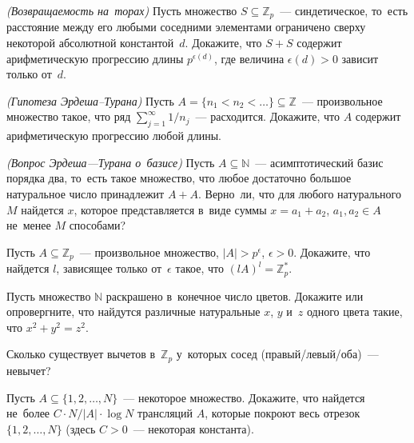 \begin{problems}
\itemx{*}\emph{(Возвращаемость на~торах)}\enspace
Пусть множество $S \subseteq \mathbb{Z}_p$~--- синдетическое, то~есть
расстояние между его любыми соседними элементами ограничено сверху некоторой
абсолютной константой~$d$.
Докажите, что $S + S$ содержит арифметическую прогрессию длины
$p^{\epsilon(d)}$, где величина $\epsilon(d) > 0$ зависит только от~$d$.

\itemx{*}\emph{(Гипотеза Эрдеша--Турана)}\enspace
Пусть $A = \{ n_1 < n_2 < \ldots \} \subseteq \mathbb{Z}$~--- произвольное
множество такое, что ряд
\(
    \sum_{j=1}^\infty
        1 / n_j
\)~--- расходится.
Докажите, что $A$ содержит арифметическую прогрессию любой длины.

\itemx{*}\emph{(Вопрос Эрдеша---Турана о~базисе)}\enspace
Пусть $A \subseteq \mathbb{N}$~--- асимптотический базис порядка два, то~есть
такое множество, что любое достаточно большое натуральное число принадлежит
$A + A$.
Верно~ли, что для любого натурального~$M$ найдется $x$, которое представляется
в~виде суммы $x = a_1 + a_2$, $a_1, a_2 \in A$ не~менее $M$ способами?

\itemx{*}
Пусть $A \subseteq \mathbb{Z}_p$~--- произвольное множество,
$|A| > p^{\epsilon}$, $\epsilon > 0$.
Докажите, что найдется $l$, зависящее только от~$\epsilon$ такое, что
$(l A)^l = \mathbb{Z}^*_p$.

\itemx{*}
Пусть множество $\mathbb{N}$ раскрашено в~конечное число цветов.
Докажите или опровергните, что найдутся различные натуральные $x$, $y$ и~$z$
одного цвета такие, что $x^2 + y^2 = z^2$.

\item
Сколько существует вычетов в~$\mathbb{Z}_p$ у~которых сосед
(правый/левый/оба)~--- невычет?

\item
Пусть $A \subseteq \{ 1, 2, \ldots, N \}$~--- некоторое множество.
Докажите, что найдется не~более $C \cdot N / |A| \cdot \log N$ трансляций $A$,
которые покроют весь отрезок $\{ 1, 2, \ldots, N \}$
(здесь $C > 0$~--- некоторая константа).

\end{problems}

